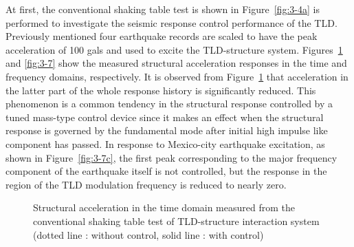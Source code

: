 At first, the conventional shaking table test is shown in Figure~\ref{fig:3-4a} is performed to investigate the seismic response control performance of the TLD. Previously mentioned four earthquake records are scaled to have the peak acceleration of 100 gals and used to excite the TLD-structure system. Figures~\ref{fig:3-6} and \ref{fig:3-7} show the measured structural acceleration responses in the time and frequency domains, respectively. It is observed from Figure~\ref{fig:3-6} that acceleration in the latter part of the whole response history is significantly reduced. This phenomenon is a common tendency in the structural response controlled by a tuned mass-type control device since it makes an effect when the structural response is governed by the fundamental mode after initial high impulse like component has passed. In response to Mexico-city earthquake excitation, as shown in Figure~\ref{fig:3-7c}, the first peak corresponding to the major frequency component of the earthquake itself is not controlled, but the response in the region of the TLD modulation frequency is reduced to nearly zero.

\begin{figure}[!ht]
\centering
\caption{Structural acceleration in the time domain measured from the conventional shaking table test of TLD-structure interaction system (dotted line : without control, solid line : with control)}
\label{fig:3-6}
\end{figure}

